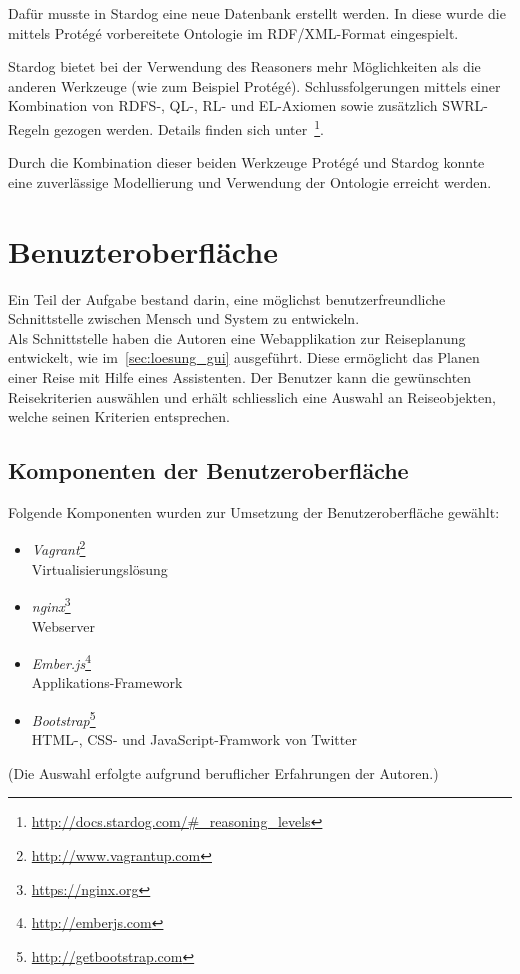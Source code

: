 Dafür musste in Stardog eine neue Datenbank erstellt werden. In diese wurde die mittels Protégé vorbereitete Ontologie im RDF/XML-Format eingespielt.

Stardog bietet bei der Verwendung des Reasoners mehr Möglichkeiten als die anderen Werkzeuge (wie zum Beispiel Protégé). Schlussfolgerungen mittels einer Kombination von RDFS-, QL-, RL- und EL-Axiomen sowie zusätzlich SWRL-Regeln gezogen werden. Details finden sich unter~\footnote{\url{http://docs.stardog.com/\#_reasoning_levels}}.


Durch die Kombination dieser beiden Werkzeuge Protégé und Stardog konnte eine zuverlässige Modellierung und Verwendung der Ontologie erreicht werden.

\section{Benuzteroberfläche}
\label{sec:komponenten:ember}
Ein Teil der Aufgabe bestand darin, eine möglichst benutzerfreundliche Schnittstelle zwischen Mensch und System zu entwickeln.\\
Als Schnittstelle haben die Autoren eine Webapplikation zur Reiseplanung entwickelt, wie im~\autoref{sec:loesung_gui} ausgeführt. Diese ermöglicht das Planen einer Reise mit Hilfe eines Assistenten. Der Benutzer kann die gewünschten Reisekriterien auswählen und erhält schliesslich eine Auswahl an Reiseobjekten, welche seinen Kriterien entsprechen.

\subsection{Komponenten der Benutzeroberfläche}
\label{subsec:komponenten:gui:komponenten}
Folgende Komponenten wurden zur Umsetzung der Benutzeroberfläche gewählt:
\begin{itemize}
    \item \textit{Vagrant}\footnote{\url{http://www.vagrantup.com}}\\
        Virtualisierungslösung
    \item \textit{nginx}\footnote{\url{https://nginx.org}}\\
        Webserver
    \item \textit{Ember.js}\footnote{\url{http://emberjs.com}}\\
        Applikations-Framework
    \item \textit{Bootstrap}\footnote{\url{http://getbootstrap.com}}\\
        HTML-, CSS- und JavaScript-Framwork von Twitter
\end{itemize}
(Die Auswahl erfolgte aufgrund beruflicher Erfahrungen der Autoren.)

